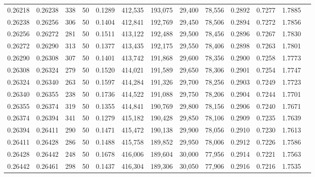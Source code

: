 \begin{tabular}{rrrrrrrrrrrrr}
0.26218 & 0.26238 &   338 &  50 &                                     0.1289 & 412,535 & 193,075 &  29,400 &  78,556 & 0.2892 & 0.7277 & 1.7885 \\
0.26238 & 0.26256 &   306 &  50 &                                     0.1404 & 412,841 & 192,769 &  29,450 &  78,506 & 0.2894 & 0.7272 & 1.7856 \\
0.26256 & 0.26272 &   281 &  50 &                                     0.1511 & 413,122 & 192,488 &  29,500 &  78,456 & 0.2896 & 0.7267 & 1.7830 \\
0.26272 & 0.26290 &   313 &  50 &                                     0.1377 & 413,435 & 192,175 &  29,550 &  78,406 & 0.2898 & 0.7263 & 1.7801 \\
0.26290 & 0.26308 &   307 &  50 &                                     0.1401 & 413,742 & 191,868 &  29,600 &  78,356 & 0.2900 & 0.7258 & 1.7773 \\
0.26308 & 0.26324 &   279 &  50 &                                     0.1520 & 414,021 & 191,589 &  29,650 &  78,306 & 0.2901 & 0.7254 & 1.7747 \\
0.26324 & 0.26340 &   263 &  50 &                                     0.1597 & 414,284 & 191,326 &  29,700 &  78,256 & 0.2903 & 0.7249 & 1.7723 \\
0.26340 & 0.26355 &   238 &  50 &                                     0.1736 & 414,522 & 191,088 &  29,750 &  78,206 & 0.2904 & 0.7244 & 1.7701 \\
0.26355 & 0.26374 &   319 &  50 &                                     0.1355 & 414,841 & 190,769 &  29,800 &  78,156 & 0.2906 & 0.7240 & 1.7671 \\
0.26374 & 0.26394 &   341 &  50 &                                     0.1279 & 415,182 & 190,428 &  29,850 &  78,106 & 0.2909 & 0.7235 & 1.7639 \\
0.26394 & 0.26411 &   290 &  50 &                                     0.1471 & 415,472 & 190,138 &  29,900 &  78,056 & 0.2910 & 0.7230 & 1.7613 \\
0.26411 & 0.26428 &   286 &  50 &                                     0.1488 & 415,758 & 189,852 &  29,950 &  78,006 & 0.2912 & 0.7226 & 1.7586 \\
0.26428 & 0.26442 &   248 &  50 &                                     0.1678 & 416,006 & 189,604 &  30,000 &  77,956 & 0.2914 & 0.7221 & 1.7563 \\
0.26442 & 0.26461 &   298 &  50 &                                     0.1437 & 416,304 & 189,306 &  30,050 &  77,906 & 0.2916 & 0.7216 & 1.7535 \\

\end{tabular}
